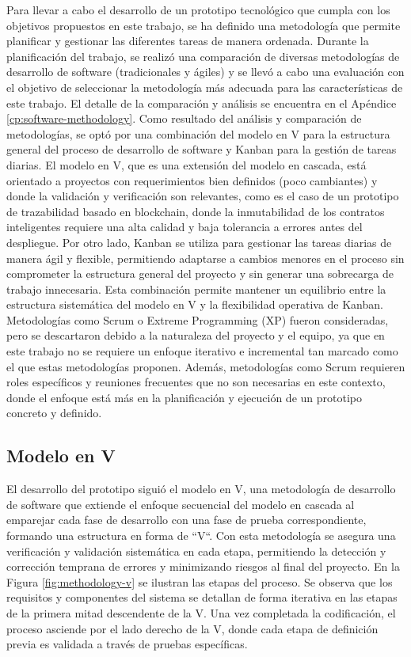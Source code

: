 Para llevar a cabo el desarrollo de un prototipo tecnológico que cumpla con los objetivos propuestos en este trabajo, se ha definido una metodología que permite planificar y gestionar las diferentes tareas de manera ordenada.
Durante la planificación del trabajo, se realizó una comparación de diversas metodologías de desarrollo de software (tradicionales y ágiles) y se llevó a cabo una evaluación con el objetivo de seleccionar la metodología más adecuada para las características de este trabajo.
El detalle de la comparación y análisis se encuentra en el Apéndice \ref{cp:software-methodology}.
Como resultado del análisis y comparación de metodologías, se optó por una combinación del modelo en V para la estructura general del proceso de desarrollo de software y Kanban para la gestión de tareas diarias.
El modelo en V, que es una extensión del modelo en cascada, está orientado a proyectos con requerimientos bien definidos (poco cambiantes) y donde la validación y verificación son relevantes, como es el caso de un prototipo de trazabilidad basado en blockchain, donde la inmutabilidad de los contratos inteligentes requiere una alta calidad y baja tolerancia a errores antes del despliegue.
Por otro lado, Kanban se utiliza para gestionar las tareas diarias de manera ágil y flexible, permitiendo adaptarse a cambios menores en el proceso sin comprometer la estructura general del proyecto y sin generar una sobrecarga de trabajo innecesaria.
Esta combinación permite mantener un equilibrio entre la estructura sistemática del modelo en V y la flexibilidad operativa de Kanban.
Metodologías como Scrum o Extreme Programming (XP) fueron consideradas, pero se descartaron debido a la naturaleza del proyecto y el equipo, ya que en este trabajo no se requiere un enfoque iterativo e incremental tan marcado como el que estas metodologías proponen.
Además, metodologías como Scrum requieren roles específicos y reuniones frecuentes que no son necesarias en este contexto, donde el enfoque está más en la planificación y ejecución de un prototipo concreto y definido.

\subsection{Modelo en V}

El desarrollo del prototipo siguió el modelo en V, una metodología de desarrollo de software que extiende el enfoque secuencial del modelo en cascada al emparejar cada fase de desarrollo con una fase de prueba correspondiente, formando una estructura en forma de ``V``.
Con esta metodología se asegura una verificación y validación sistemática en cada etapa, permitiendo la detección y corrección temprana de errores y minimizando riesgos al final del proyecto.
En la Figura \ref{fig:methodology-v} se ilustran las etapas del proceso.
Se observa que los requisitos y componentes del sistema se detallan de forma iterativa en las etapas de la primera mitad descendente de la V. Una vez completada la codificación, el proceso asciende por el lado derecho de la V, donde cada etapa de definición previa es validada a través de pruebas específicas.

